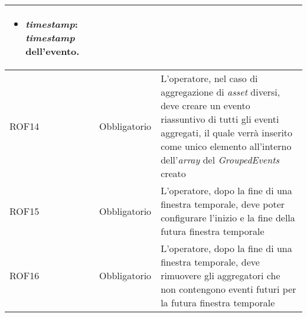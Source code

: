 {\begin{longtable}{L{3cm} L{3cm} L{7.5cm}}
\begin{itemize}
	\item{\textbf{\textit{\textit{\gls{timestamp}}}:} \textit{\gls{timestamp}} dell'evento.}
\end{itemize}\\
\hline
ROF14 & Obbligatorio & L'operatore, nel caso di aggregazione di \textit{asset} diversi, deve creare un evento riassuntivo di tutti gli eventi aggregati, il quale verrà inserito come unico elemento all'interno dell'\textit{array} del \textit{GroupedEvents} creato\\
\hline
ROF15 & Obbligatorio & L'operatore, dopo la fine di una finestra temporale, deve poter configurare l'inizio e la fine della futura finestra temporale\\
\hline
ROF16 & Obbligatorio & L'operatore, dopo la fine di una finestra temporale, deve rimuovere gli aggregatori che non contengono eventi futuri per la futura finestra temporale\\
\hline
\end{longtable}
}

